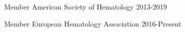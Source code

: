 


\begin{cvhonors}


\cvhonor
{Member} %
{American Society of Hematology} %
{} %
{2013-2019} %
    

\cvhonor
{Member} %
{European Hematology Association} %
{} %
{2016-Present} %

\end{cvhonors}